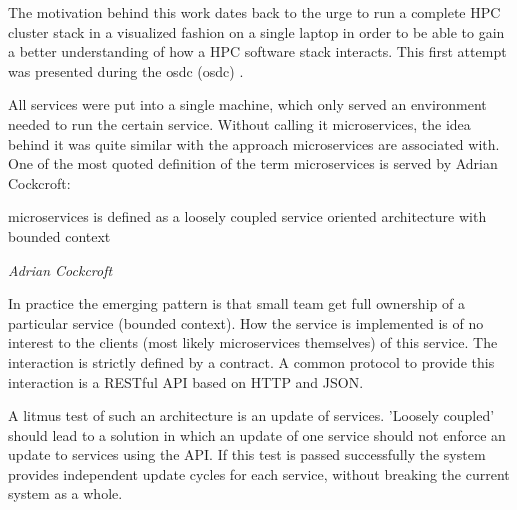 The motivation behind this work dates back to the urge to run a complete HPC cluster stack in a visualized fashion on a single laptop in order to be able to gain a better understanding of how a HPC software stack interacts.
This first attempt was presented during the \gls{osdc} (\glsdesc{osdc}) .

All services were put into a single machine, which only served an environment needed to run the certain service.
Without calling it microservices, the idea behind it was quite similar with the approach microservices are associated with.
One of the most quoted definition of the term microservices is served by Adrian Cockcroft:
\epigraph{microservices is defined as a loosely coupled service oriented architecture with bounded context}{\textit{Adrian Cockcroft}}
In practice the emerging pattern is that small team get full ownership of a particular service (bounded context).
How the service is implemented is of no interest to the clients (most likely microservices themselves) of this service.
The interaction is strictly defined by a contract. A common protocol to provide this interaction is a RESTful API based on HTTP and JSON.

A litmus test of such an architecture is an update of services. 'Loosely coupled' should lead to a solution in which an update of one service
should not enforce an update to services using the API. If this test is passed successfully the system provides
independent update cycles for each service, without breaking the current system as a whole.

